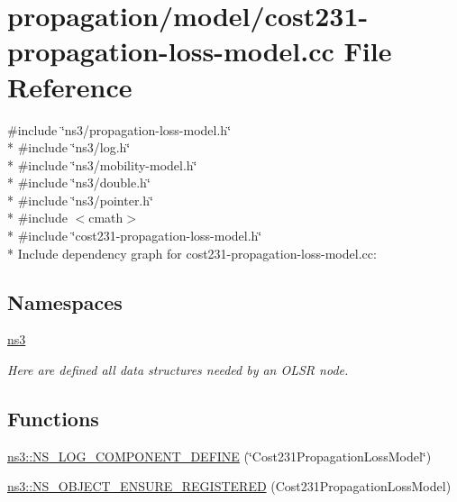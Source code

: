 \hypertarget{cost231-propagation-loss-model_8cc}{}\section{propagation/model/cost231-\/propagation-\/loss-\/model.cc File Reference}
\label{cost231-propagation-loss-model_8cc}
{\ttfamily \#include \char`\"{}ns3/propagation-\/loss-\/model.\+h\char`\"{}}\\*
{\ttfamily \#include \char`\"{}ns3/log.\+h\char`\"{}}\\*
{\ttfamily \#include \char`\"{}ns3/mobility-\/model.\+h\char`\"{}}\\*
{\ttfamily \#include \char`\"{}ns3/double.\+h\char`\"{}}\\*
{\ttfamily \#include \char`\"{}ns3/pointer.\+h\char`\"{}}\\*
{\ttfamily \#include $<$cmath$>$}\\*
{\ttfamily \#include \char`\"{}cost231-\/propagation-\/loss-\/model.\+h\char`\"{}}\\*
Include dependency graph for cost231-\/propagation-\/loss-\/model.cc\+:
\subsection*{Namespaces}
\begin{DoxyCompactItemize}
\item 
 \hyperlink{namespacens3}{ns3}
\begin{DoxyCompactList}\small\item\em Here are defined all data structures needed by an O\+L\+SR node. \end{DoxyCompactList}\end{DoxyCompactItemize}
\subsection*{Functions}
\begin{DoxyCompactItemize}
\item 
\hyperlink{namespacens3_ae40b0444b8ffdfc314a3a2f7c06e98e5}{ns3\+::\+N\+S\+\_\+\+L\+O\+G\+\_\+\+C\+O\+M\+P\+O\+N\+E\+N\+T\+\_\+\+D\+E\+F\+I\+NE} (\char`\"{}Cost231\+Propagation\+Loss\+Model\char`\"{})
\item 
\hyperlink{namespacens3_aee0a279c7c9945dc43cd02d04700f7ff}{ns3\+::\+N\+S\+\_\+\+O\+B\+J\+E\+C\+T\+\_\+\+E\+N\+S\+U\+R\+E\+\_\+\+R\+E\+G\+I\+S\+T\+E\+R\+ED} (Cost231\+Propagation\+Loss\+Model)
\end{DoxyCompactItemize}
